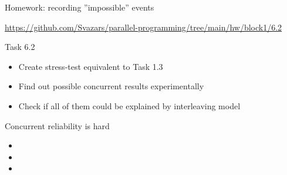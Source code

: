 \begin{frame}[t,fragile]{Homework: recording ''impossible'' events}

{\small\url{https://github.com/Svazars/parallel-programming/tree/main/hw/block1/6.2}}
\begin{homeworkmail}{Task 6.2}
    \begin{itemize}
        \item Create stress-test equivalent to Task 1.3
        \item Find out possible concurrent results experimentally
        \item Check if all of them could be explained by interleaving model
    \end{itemize}
\end{homeworkmail}
\end{frame}

\begin{frame}[t,fragile]{Concurrent reliability is hard}

\begin{itemize}
  \item \alarmOne
  \item \alarmTwo
  \item \alarmThree
\end{itemize}
\end{frame}


